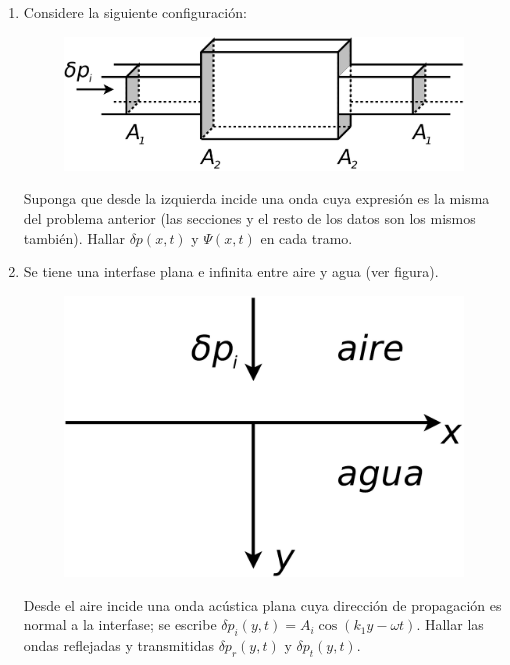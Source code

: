 \documentclass[11pt,spanish,a4paper]{article}
\begin{document}
\begin{enumerate}
\item Considere la siguiente configuración:
\begin{figure}[H]
\centering{}\includegraphics[clip,scale=0.25]{ej2-11}
\end{figure}
Suponga que desde la izquierda incide una onda cuya expresión es la
misma del problema anterior (las secciones y el resto de los datos
son los mismos también). Hallar $\delta p(x,t)$ y $\Psi(x,t)$ en
cada tramo.
\item Se tiene una interfase plana e infinita entre aire y agua (ver figura).
\begin{figure}[H]
\centering{}\includegraphics[clip,scale=0.25]{ej2-12}
\end{figure}
Desde el aire incide una onda acústica plana cuya dirección de propagación
es normal a la interfase; se escribe $\delta p_{i}(y,t)=A_{i}\cos\left(k_{1}y-\omega t\right)$.
Hallar las ondas reflejadas y transmitidas $\delta p_{r}(y,t)$ y
$\delta p_{t}(y,t)$.



\end{enumerate}
\end{document}
